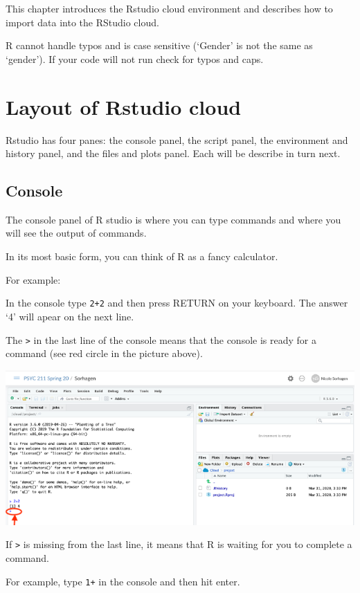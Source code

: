 \documentclass[
]{book}
\begin{document}
This chapter introduces the Rstudio cloud environment and describes how to import data into the RStudio cloud.

R cannot handle typos and is case sensitive (`Gender' is not the same as `gender'). If your code will not run check for typos and caps.

\hypertarget{layout-of-rstudio-cloud}{%
\section{Layout of Rstudio cloud}\label{layout-of-rstudio-cloud}}

Rstudio has four panes: the console panel, the script panel, the environment and history panel, and the files and plots panel. Each will be describe in turn next.

\hypertarget{console}{%
\subsection{Console}\label{console}}

The console panel of R studio is where you can type commands and where you will see the output of commands.

In its most basic form, you can think of R as a fancy calculator.

For example:

In the console type \texttt{2+2} and then press RETURN on your keyboard. The answer `4' will apear on the next line.

The \texttt{\textgreater{}} in the last line of the console means that the console is ready for a command (see red circle in the picture above).

\includegraphics{img/twoplus.png}

If \texttt{\textgreater{}} is missing from the last line, it means that R is waiting for you to complete a command.

For example, type \texttt{1+} in the console and then hit enter.
\end{document}
